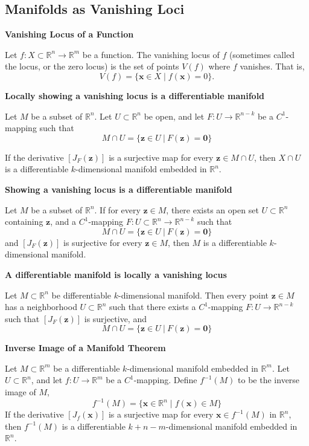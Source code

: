\documentclass{article}
\newcommand{\R}{\mathbb{R}}
\newenvironment{definition}[1]{
    \par\noindent\textbf{#1}\par\noindent
}{
    \par \vspace{0.5cm}
}
\begin{document}
\subsection{Manifolds as Vanishing Loci}

\begin{definition}{Vanishing Locus of a Function}
Let \(f : X \subset \R^n \to \R^m\) be a function. The vanishing locus of \(f\) (sometimes called the locus, or the zero locus) is the set of points \(V(f)\) where \(f\) vanishes. That is,
\[
V(f) = \{\bm{x} \in X \mid f(\bm{x}) = 0\}.
\]
\end{definition}


 \begin{definition}{Locally showing a vanishing locus is a differentiable manifold}
     Let $M$ be a subset of $\R^n$. Let $U \subset \R^n$ be open, and let $F : U \to \R^{n-k}$ be a $C^1$-mapping such that
    $$M \cap U = \{\bm{z} \in U \ | \ F(\bm{z}) = \bm{0} \}$$
    
    If the derivative $[J_F(\bm{z})]$ is a surjective map for every $\bm{z} \in M \cap U$, then $X \cap U$ is a differentiable $k$-dimensional manifold embedded in $\R^n$.  
\end{definition}


\begin{definition}{Showing a vanishing locus is a differentiable manifold}
    Let $M$ be a subset of $\R^n$.  If for every $\bm{z} \in M$, there exists an open set $U  \subset \R^n$ containing $\bm{z}$, and a $C^1$-mapping $F : U \subset \R^n \to \R^{n-k}$ such that 
    $$M \cap U = \{\bm{z} \in U \ | \ F(\bm{z}) = \bm{0} \}$$
    and $[J_F(\bm{z})]$ is surjective for every $\bm{z} \in M$, then $M$ is a differentiable $k$-dimensional manifold.
\end{definition}

    \begin{definition}{A differentiable manifold is locally a vanishing locus}
    Let $M \subset \R^n$ be differentiable $k$-dimensional manifold.  Then every point $\bm{z} \in M$ has a neighborhood $U \subset \R^n$ such that there exists a $C^1$-mapping $F : U \to \R^{n-k}$ such that $[J_F(\bm{z})]$ is surjective, and
    $$M \cap U = \{\bm{z} \in U \ | \ F(\bm{z}) = \bm{0} \}$$
    
    \end{definition}


\begin{definition}{Inverse Image of a Manifold Theorem}
Let \( M \subset \R^m \) be a differentiable \( k \)-dimensional manifold embedded in \( \R^m \). Let \( U \subset \R^n \), and let \( f: U \to \R^m \) be a \( C^1 \)-mapping. Define \( f^{-1}(M) \) to be the inverse image of \( M \),
\[ f^{-1}(M) = \{ \bm{x} \in \R^n \mid f(\bm{x}) \in M \} \]
If the derivative \( [J_f(\bm{x})] \) is a surjective map for every \( \bm{x} \in f^{-1}(M) \) in \( \R^n \), then \( f^{-1}(M) \) is a differentiable \( k + n - m \)-dimensional manifold embedded in \( \R^n \).
\end{definition}
\end{document}
